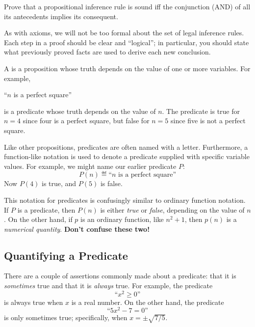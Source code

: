 \begin{notesproblem}
Prove that a propositional inference rule is sound iff the conjunction
(AND) of all its antecedents implies its consequent.
\end{notesproblem}

As with axioms, we will not be too formal about the set of legal inference
rules.  Each step in a proof should be clear and ``logical''; in
particular, you should state what previously proved facts are used to
derive each new conclusion.


A  is a proposition whose truth depends on the value of
one or more variables.  For example,
%
\begin{center}
``$n$ is a perfect square''
\end{center}
%
is a predicate whose truth depends on the value of $n$.  The predicate
is true for $n = 4$ since four is a perfect square, but false for $n =
5$ since five is not a perfect square.

Like other propositions, predicates are often named with a letter.
Furthermore, a function-like notation is used to denote a predicate
supplied with specific variable values.  For example, we might name
our earlier predicate $P$:
%
\[
P(n) \eqdef \text{``$n$ is a perfect square''}
\]
%
Now $P(4)$ is true, and $P(5)$ is false.

This notation for predicates is confusingly similar to ordinary function
notation.  If $P$ is a predicate, then $P(n)$ is either \textit{true} or
\textit{false}, depending on the value of $n$.  On the other hand, if $p$
is an ordinary function, like $n^2 + 1$, then $p(n)$ is a
\textit{numerical quantity}.  \textbf{Don't confuse these two!}

\subsection{Quantifying a Predicate}

There are a couple of assertions commonly made about a predicate: that it
is \textit{sometimes} true and that it is \textit{always} true.  For
example, the predicate
%
\[
\text{``$x^2 \geq 0$''}
\]
%
is always true when $x$ is a real number.  On the other hand, the
predicate
%
\[
\text{``$5x^2 - 7 = 0$''}
\]
%
is only sometimes true; specifically, when $x = \pm \sqrt{7/5}$.

